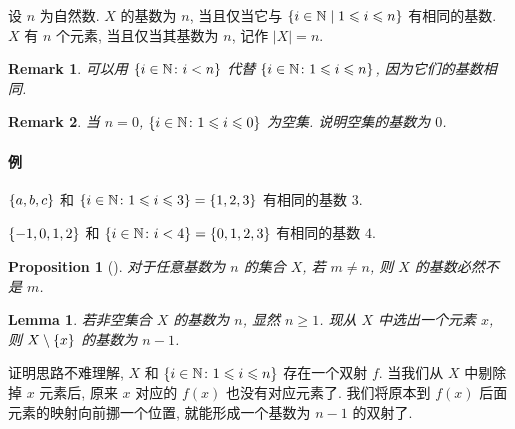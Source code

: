 \documentclass[UTF8]{ctexart}
\theoremstyle{mystyle}
\newtheorem{lemma}{Lemma}[section]
\newtheorem{proposition}{Proposition}[section]
\theoremstyle{myremark}
\newtheorem*{remark}{Remark}
\theoremstyle{plain}
\newcommand{\N}{\mathbb N}
\DeclarePairedDelimiter\set{\{}{\}}
\begin{document}
\begin{definition}[\text{基数}]
    设 $ n $ 为自然数. $ X $ 的基数为 $ n $, 当且仅当它与 $ \set{i \in \N \mid 1 \leqslant i \leqslant n} $ 有相同的基数. $ X $ 有 $ n $ 个元素, 当且仅当其基数为 $ n $, 记作 $ |X| = n $.
\end{definition}

\begin{remark}
    可以用 $ \set{i \in \N \colon i < n} $ 代替 $ \set{i \in \N \colon 1 \leqslant i \leqslant n} $, 因为它们的基数相同.
\end{remark}

\begin{remark}
    当 $ n = 0 $, $ \set{i \in \N \colon 1 \leqslant i \leqslant 0} $ 为空集. 说明空集的基数为 $ 0 $.
\end{remark}

\paragraph{例}
$ \set{a, b, c} $ 和 $ \set{i \in \N \colon 1 \leqslant i \leqslant 3} = \set{1, 2, 3} $ 有相同的基数 $ 3 $.

$ \set{-1, 0, 1, 2} $ 和 $ \set{i \in \N \colon i < 4} = \set{0, 1, 2, 3} $ 有相同的基数 $ 4 $.

\begin{proposition}[]
    对于任意基数为 $ n $ 的集合 $ X $, 若 $ m \neq n $, 则 $ X $ 的基数必然不是 $ m $.
\end{proposition}

\begin{lemma} \label{cardinary}
    若非空集合 $ X $ 的基数为 $ n $, 显然 $ n \geqslant 1 $. 现从 $ X $ 中选出一个元素 $ x $, 则 $ X \setminus \set x $ 的基数为 $ n - 1 $.
\end{lemma}

证明思路不难理解, $ X $ 和 $ \set{i \in \N \colon 1 \leqslant i \leqslant n} $ 存在一个双射 $ f $. 当我们从 $ X $ 中剔除掉 $ x $ 元素后, 原来 $ x $ 对应的 $ f(x) $ 也没有对应元素了. 我们将原本到 $ f(x) $ 后面元素的映射向前挪一个位置, 就能形成一个基数为 $ n - 1 $ 的双射了. 
\end{document}
